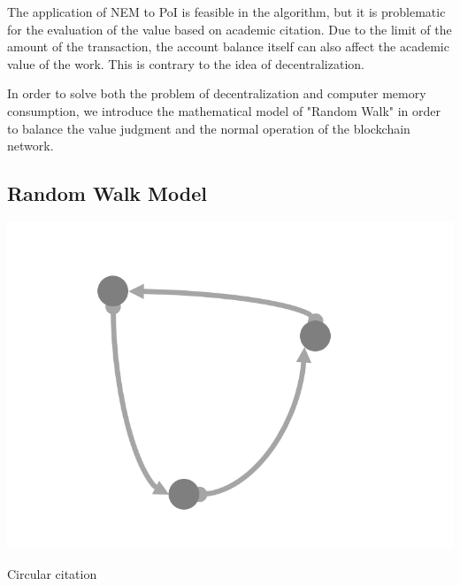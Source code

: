 \documentclass[a4paper,oneside,openany]{tufte-book}
\begin{document}
The application of NEM to PoI is feasible in the algorithm, but it is problematic for the evaluation of the value based on academic citation. Due to the limit of the amount of the transaction, the account balance itself can also affect the academic value of the work. This is contrary to the idea of decentralization.



In order to solve both the problem of decentralization and computer memory consumption, we introduce the mathematical model of "Random Walk" in order to balance the value judgment and the normal operation of the blockchain network.

\subsection{Random Walk Model}



\begin{marginfigure}
  \includegraphics[width=\textwidth]{fig/cirC.png}
  \caption{Circular citation}
\end{marginfigure}
\end{document}
